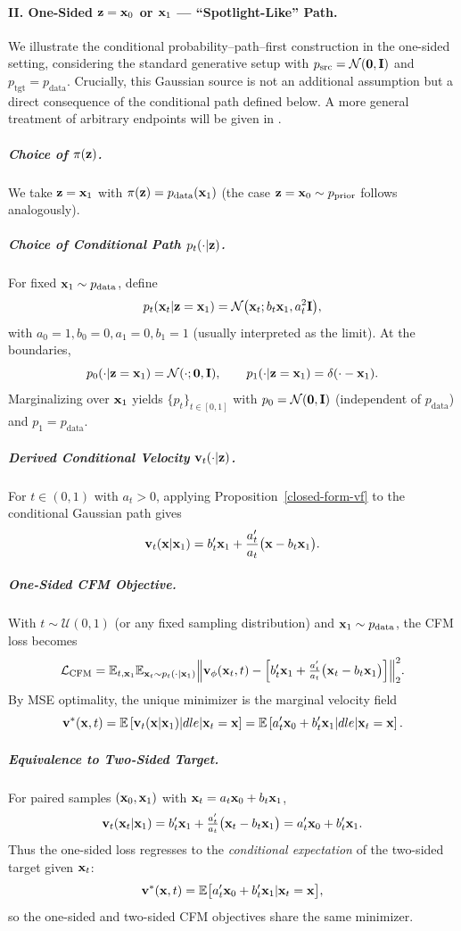 \paragraph{II. One-Sided ${\mathbf{z}} = {\mathbf{x}}_0$ or ${\mathbf{x}}_1$ — ``Spotlight-Like'' Path.}
We illustrate the conditional probability–path–first construction in the one-sided setting, considering the standard generative setup with $p_{\mathrm{src}}=\mathcal N(\bm 0,{\mathbf{I}})$ and $p_{\mathrm{tgt}}=p_{\mathrm{data}}$.
Crucially, this Gaussian source is not an additional assumption but a direct consequence of the conditional path defined below.
A more general treatment of arbitrary endpoints will be given in .

\subparagraph{Choice of $\pi({\mathbf{z}})$.}
We take ${\mathbf{z}}={\mathbf{x}}_1$ with $\pi({\mathbf{z}})=p_{\mathrm{data}}({\mathbf{x}}_1)$ (the case ${\mathbf{z}}={\mathbf{x}}_0\sim p_{\mathrm{prior}}$ follows analogously).

\subparagraph{Choice of Conditional Path $p_t(\cdot|{\mathbf{z}})$.}
For fixed ${\mathbf{x}}_1\sim p_{\mathrm{data}}$, define
\[
p_t({\mathbf{x}}_t|{\mathbf{z}}={\mathbf{x}}_1)=\mathcal N \big({\mathbf{x}}_t; b_t {\mathbf{x}}_1, a_t^2 {\mathbf{I}}\big),
\]
with $ a_0=1, b_0=0, a_1=0, b_1=1$ (usually interpreted as the limit).
At the boundaries,
\[
p_0(\cdot|{\mathbf{z}}={\mathbf{x}}_1)=\mathcal N(\cdot; \bm 0,{\mathbf{I}}),\qquad
p_1(\cdot|{\mathbf{z}}={\mathbf{x}}_1)=\delta(\cdot - {\mathbf{x}}_1).
\]
Marginalizing over ${\mathbf{x}}_1$ yields $\{p_t\}_{t\in[0,1]}$ with
$p_0=\mathcal N(\bm 0,{\mathbf{I}})$ (independent of $p_{\mathrm{data}}$) and $p_1=p_{\mathrm{data}}$.

\subparagraph{Derived Conditional Velocity  ${\mathbf{v}}_t(\cdot|{\mathbf{z}})$.}
For $t\in(0,1)$ with $a_t>0$, applying Proposition~\ref{closed-form-vf} to the conditional Gaussian path gives
\[
\mathbf v_t({\mathbf{x}}|{\mathbf{x}}_1)
= b_t' {\mathbf{x}}_1 + \frac{a_t'}{a_t} \big({\mathbf{x}} - b_t {\mathbf{x}}_1\big).
\]

\subparagraph{One-Sided CFM Objective.}
With $t\sim\mathcal U(0,1)$ (or any fixed sampling distribution) and ${\mathbf{x}}_1\sim p_{\mathrm{data}}$, the CFM loss becomes
\begin{align}\label{eq:one-sided-cfm}
    \mathcal L_{\mathrm{CFM}}
=\mathbb{E}_{t,{\mathbf{x}}_1} \mathbb{E}_{{\mathbf{x}}_t\sim p_t(\cdot|{\mathbf{x}}_1)}
\Big\|\mathbf v_\phi({\mathbf{x}}_t,t)-
\Big[b_t'{\mathbf{x}}_1+\tfrac{a_t'}{a_t}\big({\mathbf{x}}_t-b_t{\mathbf{x}}_1\big)\Big]\Big\|_2^2.
\end{align}
By MSE optimality, the unique minimizer is the marginal velocity field
\[
\mathbf v^*({\mathbf{x}},t)
= \mathbb{E} \left[\mathbf v_t({\mathbf{x}}|{\mathbf{x}}_1) |dle|  {\mathbf{x}}_t={\mathbf{x}}\right]
= \mathbb{E} \left[a_t'{\mathbf{x}}_0+b_t'{\mathbf{x}}_1 |dle|  {\mathbf{x}}_t={\mathbf{x}}\right].
\]

\subparagraph{Equivalence to Two-Sided Target.}
For paired samples $({\mathbf{x}}_0,{\mathbf{x}}_1)$ with ${\mathbf{x}}_t=a_t{\mathbf{x}}_0+b_t{\mathbf{x}}_1$,
\[
\mathbf v_t({\mathbf{x}}_t|{\mathbf{x}}_1)
= b_t'{\mathbf{x}}_1 + \tfrac{a_t'}{a_t}\big({\mathbf{x}}_t-b_t{\mathbf{x}}_1\big)
= a_t'{\mathbf{x}}_0 + b_t'{\mathbf{x}}_1.
\]
Thus the one-sided loss regresses to the \emph{conditional expectation} of the two-sided target given ${\mathbf{x}}_t$:
\[
\mathbf v^*({\mathbf{x}},t)=\mathbb{E} \big[a_t'{\mathbf{x}}_0 + b_t'{\mathbf{x}}_1 | {\mathbf{x}}_t={\mathbf{x}}\big],
\]
so the one-sided and two-sided CFM objectives share the same minimizer.


